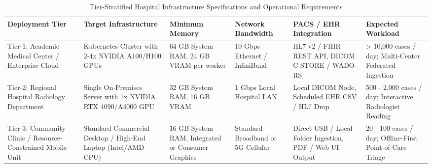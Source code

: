 \begin{table}
\caption{Tier-Stratified Hospital Infrastructure Specifications and Operational Requirements}
\label{tab:table_5_03_07_tier_stratified_clinical_deployment_hardware_requirements}
\begin{tabular}{llllll}
\toprule
Deployment Tier & Target Infrastructure & Minimum Memory & Network Bandwidth & PACS / EHR Integration & Expected Workload \\
\midrule
Tier-1: Academic Medical Center / Enterprise Cloud & Kubernetes Cluster with 2-4x NVIDIA A100/H100 GPUs & 64 GB System RAM, 24 GB VRAM per worker & 10 Gbps Ethernet / InfiniBand & HL7 v2 / FHIR REST API, DICOM C-STORE / WADO-RS & > 10,000 cases / day; Multi-Center Federated Ingestion \\
Tier-2: Regional Hospital Radiology Department & Single On-Premises Server with 1x NVIDIA RTX 4090/A4000 GPU & 32 GB System RAM, 16 GB VRAM & 1 Gbps Local Hospital LAN & Local DICOM Node, Scheduled EHR CSV / HL7 Drop & 500 - 2,000 cases / day; Interactive Radiologist Reading \\
Tier-3: Community Clinic / Resource-Constrained Mobile Unit & Standard Commercial Desktop / High-End Laptop (Intel/AMD CPU) & 16 GB System RAM, Integrated or Consumer Graphics & Standard Broadband or 5G Cellular & Direct USB / Local Folder Ingestion, PDF / Web UI Output & 20 - 100 cases / day; Offline-First Point-of-Care Triage \\
\bottomrule
\end{tabular}
\end{table}

